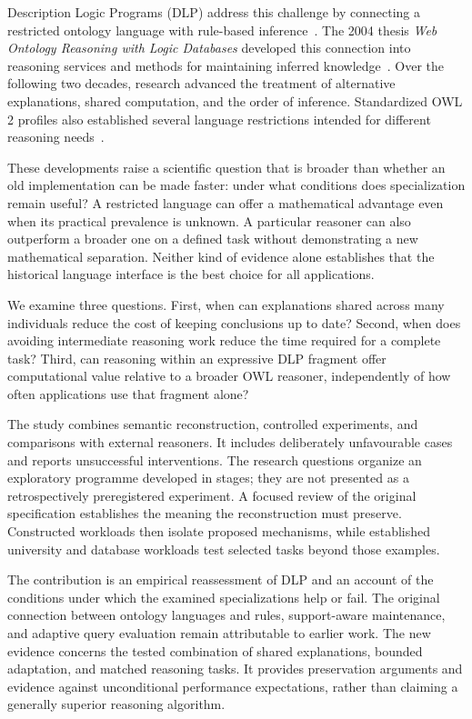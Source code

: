 \documentclass{article}
\begin{document}
Description Logic Programs (DLP) address this challenge by connecting a
restricted ontology language with rule-based inference~\cite{grosof2003}.
The 2004 thesis \emph{Web Ontology Reasoning with Logic Databases} developed
this connection into reasoning services and methods for maintaining inferred
knowledge~\cite{volz2004,volz2003maintenance}. Over the following two decades,
research advanced the treatment of alternative explanations, shared
computation, and the order of inference. Standardized OWL 2 profiles also
established several language restrictions intended for different reasoning
needs~\cite{owlprofiles2012}.

These developments raise a scientific question that is broader than whether
an old implementation can be made faster: under what conditions does
specialization remain useful? A restricted language can offer a mathematical
advantage even when its practical prevalence is unknown. A particular reasoner
can also outperform a broader one on a defined task without demonstrating a
new mathematical separation. Neither kind of evidence alone establishes that
the historical language interface is the best choice for all applications.

We examine three questions. First, when can explanations shared across many
individuals reduce the cost of keeping conclusions up to date? Second, when
does avoiding intermediate reasoning work reduce the time required for a
complete task? Third, can reasoning within an expressive DLP fragment offer
computational value relative to a broader OWL reasoner, independently of how
often applications use that fragment alone?

The study combines semantic reconstruction, controlled experiments, and
comparisons with external reasoners. It includes deliberately unfavourable
cases and reports unsuccessful interventions. The research questions organize
an exploratory programme developed in stages; they are not presented as a
retrospectively preregistered experiment. A focused review of the original
specification establishes the meaning the reconstruction must preserve.
Constructed workloads then isolate proposed mechanisms, while established
university and database workloads test selected tasks beyond those examples.

The contribution is an empirical reassessment of DLP and an account of the
conditions under which the examined specializations help or fail. The original
connection between ontology languages and rules, support-aware maintenance,
and adaptive query evaluation remain attributable to earlier work. The new
evidence concerns the tested combination of shared explanations, bounded
adaptation, and matched reasoning tasks. It provides preservation arguments
and evidence against unconditional performance expectations, rather than claiming
a generally superior reasoning algorithm.
\end{document}
